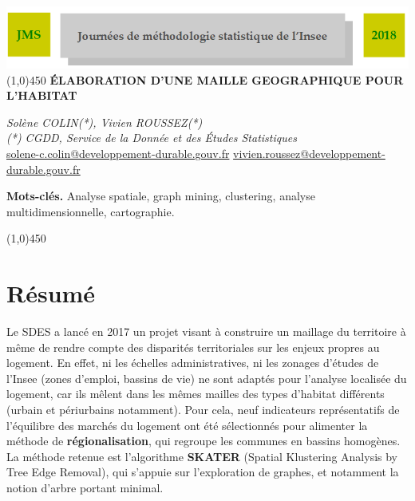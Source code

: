 \documentclass[12pt, a4paper]{article}
\begin{document}
\begin{center}
\includegraphics[width=15cm]{head_jms2018.png} 
\line(1,0){450}
\vspace{5mm}
\textbf{{\huge \'E}\Large LABORATION D'UNE MAILLE GEOGRAPHIQUE POUR L'HABITAT}
\end{center}

\begin{center}
\textit{Solène COLIN(*), Vivien ROUSSEZ(*)} \\
\vspace{2mm}
\textit{(*) CGDD, Service de la Donnée et des \'Etudes Statistiques}\\ 

\vspace{2mm}
\url{solene-c.colin@developpement-durable.gouv.fr} \url{vivien.roussez@developpement-durable.gouv.fr} 
\end{center}
\vspace{5mm}
\small{{\bf Mots-cl\'es.} Analyse spatiale, graph mining, clustering, analyse multidimensionnelle, cartographie.}

\begin{center}
\line(1,0){450}
\end{center}


\section*{Résumé}

Le SDES a lancé en 2017 un projet visant à construire un maillage du territoire à même de rendre compte des disparités territoriales sur les enjeux propres au logement. En effet, ni les échelles administratives, ni les zonages d'études de l'Insee (zones d'emploi, bassins de vie) ne sont adaptés pour l'analyse localisée du logement, car ils mêlent dans les mêmes mailles des types d'habitat différents (urbain et périurbains notamment). Pour cela, neuf indicateurs représentatifs de l'équilibre des marchés du logement ont été sélectionnés pour alimenter la méthode de \textbf{régionalisation}, qui regroupe les communes en bassins homogènes. La méthode retenue est l'algorithme \textbf{SKATER} (Spatial Klustering Analysis by Tree Edge Removal), qui s'appuie sur l'exploration de graphes, et notamment la notion d'arbre portant minimal. \\
\end{document}
